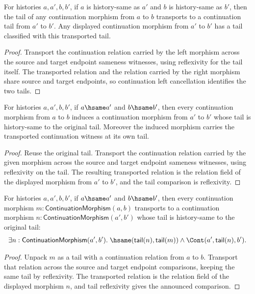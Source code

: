 \begin{theorem}
\label{thm:continuation-morphism-endpoint-transport-tail-classified}
For histories $a,a',b,b'$, if $a$ is history-same as $a'$ and $b$ is
history-same as $b'$, then the tail of any continuation morphism from $a$ to
$b$ transports to a continuation tail from $a'$ to $b'$. Any displayed
continuation morphism from $a'$ to $b'$ has a tail classified with this
transported tail.
\end{theorem}
\begin{proof}
Transport the continuation relation carried by the left morphism across the
source and target endpoint sameness witnesses, using reflexivity for the tail
itself. The transported relation and the relation carried by the right morphism
share source and target endpoints, so continuation left cancellation identifies
the two tails.
\end{proof}

\begin{theorem}
\label{thm:continuation-morphism-endpoint-transport-exists}
For histories $a,a',b,b'$, if $a\hsame a'$ and $b\hsame b'$, then every
continuation morphism from $a$ to $b$ induces a continuation morphism from
$a'$ to $b'$ whose tail is history-same to the original tail. Moreover the
induced morphism carries the transported continuation witness at its own tail.
\end{theorem}
\begin{proof}
Reuse the original tail. Transport the continuation relation carried by the
given morphism across the source and target endpoint sameness witnesses, using
reflexivity on the tail. The resulting transported relation is the relation
field of the displayed morphism from $a'$ to $b'$, and the tail comparison is
reflexivity.
\end{proof}

\begin{theorem}
\label{thm:category-continuation-morphism-endpoint-transport-witness}
For histories $a,a',b,b'$, if $a\hsame a'$ and $b\hsame b'$, then every
continuation morphism $m:\mathsf{ContinuationMorphism}(a,b)$ transports to a
continuation morphism $n:\mathsf{ContinuationMorphism}(a',b')$ whose tail is
history-same to the original tail:
$$
\exists n:\mathsf{ContinuationMorphism}(a',b').\;
\hsame(\mathsf{tail}(n),\mathsf{tail}(m))\land
\Cont(a',\mathsf{tail}(n),b').
$$
\end{theorem}
\begin{proof}
Unpack $m$ as a tail with a continuation relation from $a$ to $b$. Transport
that relation across the source and target endpoint comparisons, keeping the
same tail by reflexivity. The transported relation is the relation field of the
displayed morphism $n$, and tail reflexivity gives the announced comparison.
\end{proof}

